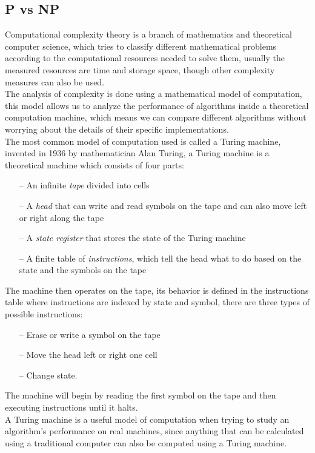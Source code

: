 \subsection{P vs NP}
\label{subsection:pvsnp}

Computational complexity theory is a branch of mathematics and theoretical computer science, which tries to classify different mathematical problems according to the computational resources needed to solve them, usually the measured resources are time and storage space, though other complexity measures can also be used.
\\The analysis of complexity is done using a mathematical model of computation, this model allows us to analyze the performance of algorithms inside a theoretical computation machine, which means we can compare different algorithms without worrying about the details of their specific implementations.
\\The most common model of computation used is called a Turing machine, invented in 1936 by mathematician Alan Turing, a Turing machine is a theoretical machine which consists of four parts:
\begin{itemize}
	\item[--] An infinite \textit{tape} divided into cells
	\item[--] A \textit{head} that can write and read symbols on the tape and can also move left or right along the tape
	\item[--] A \textit{state register} that stores the state of the Turing machine
	\item[--] A finite table of \textit{instructions}, which tell the head what to do based on the state and the symbols on the tape
\end{itemize}
The machine then operates on the tape, its behavior is defined in the instructions table where instructions are indexed by state and symbol, there are three types of possible instructions:
\begin{itemize}
	\item[--] Erase or write a symbol on the tape
	\item[--] Move the head left or right one cell
	\item[--] Change state. 
\end{itemize}
The machine will begin by reading the first symbol on the tape and then executing instructions until it halts. 
\\A Turing machine is a useful model of computation when trying to study an algorithm's performance on real machines, since anything that can be calculated using a traditional computer can also be computed using a Turing machine.
